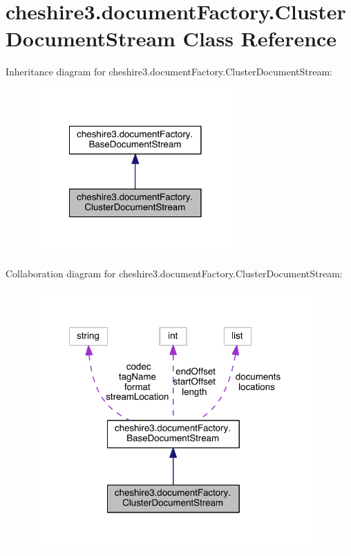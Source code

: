\hypertarget{classcheshire3_1_1document_factory_1_1_cluster_document_stream}{\section{cheshire3.\-document\-Factory.\-Cluster\-Document\-Stream Class Reference}
\label{classcheshire3_1_1document_factory_1_1_cluster_document_stream}
}


Inheritance diagram for cheshire3.\-document\-Factory.\-Cluster\-Document\-Stream\-:
\nopagebreak
\begin{figure}[H]
\begin{center}
\leavevmode
\includegraphics[width=222pt]{classcheshire3_1_1document_factory_1_1_cluster_document_stream__inherit__graph}
\end{center}
\end{figure}


Collaboration diagram for cheshire3.\-document\-Factory.\-Cluster\-Document\-Stream\-:
\nopagebreak
\begin{figure}[H]
\begin{center}
\leavevmode
\includegraphics[width=309pt]{classcheshire3_1_1document_factory_1_1_cluster_document_stream__coll__graph}
\end{center}
\end{figure}
